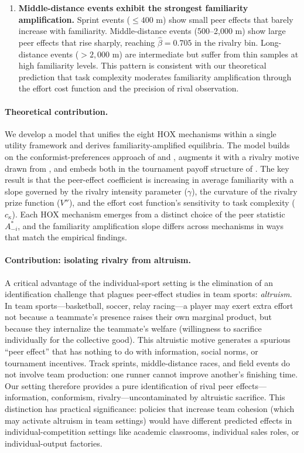 \documentclass[12pt]{article}
\theoremstyle{definition}
\theoremstyle{remark}
\begin{document}
\begin{enumerate}[leftmargin=0.5in, label=\textit{Result \arabic*.}]
\item \textbf{Middle-distance events exhibit the strongest familiarity amplification.}
Sprint events ($\le 400$ m) show small peer effects that barely increase with
familiarity.
Middle-distance events (500--2{,}000 m) show large peer effects that rise sharply,
reaching $\hat\beta = 0.705$ in the rivalry bin.
Long-distance events ($> 2{,}000$ m) are intermediate but suffer from thin
samples at high familiarity levels.
This pattern is consistent with our theoretical prediction that task complexity
moderates familiarity amplification through the effort cost function and the
precision of rival observation.

\end{enumerate}

\paragraph{Theoretical contribution.}
We develop a model that unifies the eight HOX mechanisms within a single
utility framework and derives familiarity-amplified equilibria.
The model builds on the conformist-preferences approach of \citet{Bernheim1994}
and \citet{Boucher2024}, augments it with a rivalry motive drawn from
\citet{BenabouTirole2006}, and embeds both in the tournament payoff structure
of \citet{LazearRosen1981}.
The key result is that the peer-effect coefficient is increasing in average
familiarity with a slope governed by the rivalry intensity parameter ($\gamma$),
the curvature of the rivalry prize function ($V''$), and the effort cost
function's sensitivity to task complexity ($c_\kappa$).
Each HOX mechanism emerges from a distinct choice of the peer statistic $A_{-i}^*$,
and the familiarity amplification slope differs across mechanisms in ways that
match the empirical findings.

\paragraph{Contribution: isolating rivalry from altruism.}
A critical advantage of the individual-sport setting is the elimination of an
identification challenge that plagues peer-effect studies in team sports:
\textit{altruism}.
In team sports---basketball, soccer, relay racing---a player may exert extra
effort not because a teammate's presence raises their own marginal product,
but because they internalize the teammate's welfare (willingness to sacrifice
individually for the collective good).
This altruistic motive generates a spurious ``peer effect'' that has nothing
to do with information, social norms, or tournament incentives.
Track sprints, middle-distance races, and field events do not involve team
production: one runner cannot improve another's finishing time.
Our setting therefore provides a pure identification of rival peer effects---
information, conformism, rivalry---uncontaminated by altruistic sacrifice.
This distinction has practical significance: policies that increase team cohesion
(which may activate altruism in team settings) would have different predicted
effects in individual-competition settings like academic classrooms, individual
sales roles, or individual-output factories.
\end{document}
